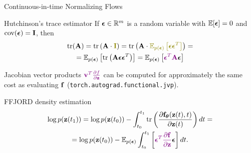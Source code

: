 \begin{frame}{Continuous-in-time Normalizing Flows}
	\begin{block}{Hutchinson's trace estimator}
		If $\boldsymbol{\epsilon} \in \mathbb{R}^m$ is a random variable with $\mathbb{E} [\boldsymbol{\epsilon}] = 0$ and $\text{cov} (\boldsymbol{\epsilon}) = \mathbf{I}$, then
		\vspace{-0.3cm}
		\begin{multline*}
		    \text{tr}(\mathbf{A}) = \text{tr}\left(\mathbf{A} \cdot {\color{olive}\bI} \right) = \text{tr}\left(\mathbf{A} \cdot {\color{olive}\mathbb{E}_{p(\bepsilon)} \left[ \bepsilon \bepsilon^T \right]} \right) = \\ 
		    =  \mathbb{E}_{p(\bepsilon)} \left[  \text{tr}\left(  \mathbf{A}  \bepsilon \bepsilon^T \right) \right] =  \mathbb{E}_{p(\bepsilon)} \left[ {\color{violet} \bepsilon^T \mathbf{A}} \bepsilon  \right]
		\end{multline*}
		\vspace{-0.6 cm}
	\end{block}
	Jacobian vector products ${\color{violet}\mathbf{v}^T \frac{\partial f}{\partial \mathbf{z}}}$ can be computed for approximately the same cost as evaluating $\mathbf{f}$ (\texttt{torch.autograd.functional.jvp}).
	\begin{block}{FFJORD density estimation}
		\vspace{-0.8cm}
		\begin{multline*}
		    \log p(\mathbf{z}(t_1)) = \log p(\mathbf{z}(t_0)) - \int_{t_0}^{t_1} \text{tr}  \left( \frac{\partial \mathbf{f}_{\boldsymbol{\theta}}(\mathbf{z}(t), t)}{\partial \mathbf{z}(t)} \right) dt = \\ = \log p(\mathbf{z}(t_0)) - \mathbb{E}_{p(\boldsymbol{\epsilon})} \int_{t_0}^{t_1} \left[ {\color{violet}\boldsymbol{\epsilon}^T \frac{\partial \mathbf{f}}{\partial \mathbf{z}}} \boldsymbol{\epsilon} \right] dt.
		\end{multline*}
	\end{block}
\end{frame}
